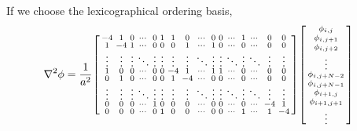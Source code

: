 If we choose the lexicographical ordering basis,
%
\begin{equation}
    \begin{split}
        \nabla^2 \phi &= \frac{ 1 }{ a^2 } \begin{bsmallmatrix}
            -4     & 1      & 0      & \cdots & 0      & 1      & 1      & 0      & \cdots & 0      & 0      & \cdots & 1      & \cdots & 0      & 0      \\
            1      & -4     & 1      & \cdots & 0      & 0      & 0      & 1      & \cdots & 1      & 0      & \cdots & 0      & \cdots & 0      & 0      \\
            \vdots & \vdots & \vdots & \ddots & \vdots & \vdots & \vdots & \vdots & \ddots & \vdots & \vdots & \ddots & \vdots & \ddots & \vdots & \vdots \\
            1      & 0      & 0      & \cdots & 0      & 0      & -4     & 1      & \cdots & 1      & 1      & \cdots & 0      & \cdots & 0      & 0      \\
            0      & 1      & 0      & \cdots & 0      & 0      & 1      & -4     & \cdots & 0      & 0      & \cdots & 0      & \cdots & 0      & 0      \\
            \vdots & \vdots & \vdots & \ddots & \vdots & \vdots & \vdots & \vdots & \ddots & \vdots & \vdots & \ddots & \vdots & \ddots & \vdots & \vdots \\
            0      & 0      & 0      & \cdots & 1      & 0      & 0      & 0      & \cdots & 0      & 0      & \cdots & 0      & \cdots & -4     & 1      \\
            0      & 0      & 0      & \cdots & 0      & 1      & 0      & 0      & \cdots & 0      & 0      & \cdots & 1      & \cdots & 1      & -4
        \end{bsmallmatrix}
        \begin{bsmallmatrix}
            \phi_{i,j}          \\
            \phi_{i, j+1}       \\
            \phi_{i, j+2}       \\
            \vdots              \\
            \phi_{i, j+N-2}     \\
            \phi_{i, j+N-1}     \\
            \phi_{i+1, j}       \\
            \phi_{i+1, j+1}     \\
            \vdots              \\

\end{bsmallmatrix}
\end{split}
\end{equation}
